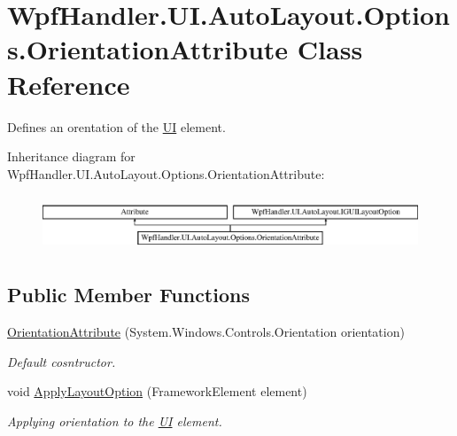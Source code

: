 \hypertarget{class_wpf_handler_1_1_u_i_1_1_auto_layout_1_1_options_1_1_orientation_attribute}{}\section{Wpf\+Handler.\+U\+I.\+Auto\+Layout.\+Options.\+Orientation\+Attribute Class Reference}
\label{class_wpf_handler_1_1_u_i_1_1_auto_layout_1_1_options_1_1_orientation_attribute}


Defines an orentation of the \mbox{\hyperlink{namespace_wpf_handler_1_1_u_i}{UI}} element.  


Inheritance diagram for Wpf\+Handler.\+U\+I.\+Auto\+Layout.\+Options.\+Orientation\+Attribute\+:\begin{figure}[H]
\begin{center}
\leavevmode
\includegraphics[height=1.696970cm]{d4/dae/class_wpf_handler_1_1_u_i_1_1_auto_layout_1_1_options_1_1_orientation_attribute}
\end{center}
\end{figure}
\subsection*{Public Member Functions}
\begin{DoxyCompactItemize}
\item 
\mbox{\hyperlink{class_wpf_handler_1_1_u_i_1_1_auto_layout_1_1_options_1_1_orientation_attribute_a1a2b97e91de843f677c37aac422b3667}{Orientation\+Attribute}} (System.\+Windows.\+Controls.\+Orientation orientation)
\begin{DoxyCompactList}\small\item\em Default cosntructor. \end{DoxyCompactList}\item 
void \mbox{\hyperlink{class_wpf_handler_1_1_u_i_1_1_auto_layout_1_1_options_1_1_orientation_attribute_affc825395d69d510dfc17e37d330dfc8}{Apply\+Layout\+Option}} (Framework\+Element element)
\begin{DoxyCompactList}\small\item\em Applying orientation to the \mbox{\hyperlink{namespace_wpf_handler_1_1_u_i}{UI}} element. \end{DoxyCompactList}\end{DoxyCompactItemize}
